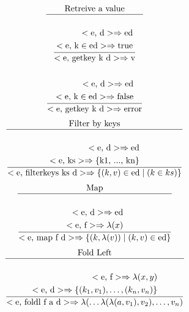 \documentclass[a4paper, 11pt]{article}
\newcommand{\te}[1]{\text{#1}}
\theoremstyle{plain}%
\theoremstyle{definition}
\theoremstyle{remark}
\begin{document}
\begin{multicols}{2}
\begin{gather*}
\end{gather*}
\begin{gather*}
	\te{Retreive a value} \\ \hline \\
	\dfrac{	\begin{aligned}
		<\te{e, d}> \Rightarrow \te{ed} \\
		<\te{e, k} \in \te{ed}> \Rightarrow \te{true}
	\end{aligned}}{<\te{e, getkey k d}> \Rightarrow \te{v}} \\ \\
	\dfrac{	\begin{aligned}
		<\te{e, d}> \Rightarrow \te{ed} \\
		<\te{e, k} \in \te{ed}> \Rightarrow \te{false}
	\end{aligned}}{<\te{e, getkey k d}> \Rightarrow \te{error}}
\end{gather*}
\begin{gather*}
	\te{Filter by keys} \\ \hline \\
	\dfrac{	\begin{aligned}
		<\te{e, d}> \Rightarrow \te{ed} \\
		<\te{e, ks}> \Rightarrow \te{\{k1, ..., kn\}}
	\end{aligned}}{<\te{e, filterkeys ks d}> \Rightarrow \{ (k, v) \in \te{ed} \mid (k \in ks) \}}
\end{gather*}
\begin{gather*}
	\te{Map} \\ \hline \\
	\dfrac{	\begin{aligned}
		<\te{e, d}> \Rightarrow \te{ed} \\
		<\te{e, f}> \Rightarrow \lambda(x)
	\end{aligned}}
	{<\te{e, map f d}> \Rightarrow \{ (k, \lambda(v)) \mid (k, v) \in \te{ed}  \}}
\end{gather*}
\begin{gather*}
	\te{Fold Left} \\ \hline \\
	\dfrac{\begin{aligned}
		<\te{e, f}> \Rightarrow \lambda(x,y)  \\
		<\te{e, d}> \Rightarrow \{(k_1, v_1), \hdots, (k_n, v_n)\}
	\end{aligned}}{<\te{e, foldl f a d}> \Rightarrow \lambda( \hdots \lambda(\lambda(a, v_1), v_2), \hdots, v_n)} \\ \\
\end{gather*}


\end{multicols}
\end{document}
